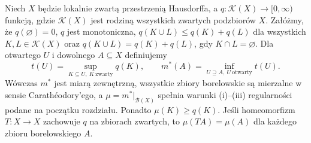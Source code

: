 \begin{lemat}
\label{lem:haar-content-to-measure-23}
Niech $X$ będzie lokalnie zwartą przestrzenią Hausdorffa,
a $q:\mathcal K(X)\to[0,\infty)$ funkcją, gdzie
$\mathcal K(X)$ jest rodziną wszystkich zwartych podzbiorów $X$.
Załóżmy, że $q(\varnothing)=0$, $q$ jest monotoniczna,
$q(K\cup L)\le q(K)+q(L)$ dla wszystkich $K,L\in\mathcal K(X)$
oraz $q(K\cup L)=q(K)+q(L)$, gdy $K\cap L=\varnothing$. Dla otwartego $U$
i dowolnego $A\subseteq X$ definiujemy
\begin{equation}\label{eq:haar-from-content-23}
 t(U)=\sup_{K\subseteq U,\ K\ \mathrm{zwarty}}q(K),
 \qquad
 m^*(A)=\inf_{U\supseteq A,\ U\ \mathrm{otwarty}}t(U).
\end{equation}
Wówczas $m^*$ jest miarą zewnętrzną,
wszystkie zbiory borelowskie są mierzalne w sensie
Carathéodory'ego, a $\mu=m^*|_{\mathcal B(X)}$
spełnia warunki (i)--(iii) regularności podane
na początku rozdziału. Ponadto $\mu(K)\ge q(K)$.
Jeśli homeomorfizm $T:X\to X$ zachowuje $q$ na
zbiorach zwartych, to $\mu(TA)=\mu(A)$ dla każdego
zbioru borelowskiego $A$.
\end{lemat}
